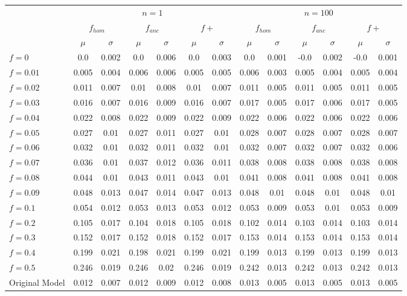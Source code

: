 \begin{tabular}{@{}lcccccccccccc@{}}
\toprule
 & \multicolumn{6}{c}{$n=1$} & \multicolumn{6}{c}{$n=100$} \\
\cmidrule(lr){2-7} \cmidrule(lr){8-13}
 & \multicolumn{2}{c}{$f_{hom}$} & \multicolumn{2}{c}{$f_{anc}$} & \multicolumn{2}{c}{$f+$} & \multicolumn{2}{c}{$f_{hom}$} & \multicolumn{2}{c}{$f_{anc}$} & \multicolumn{2}{c}{$f+$} \\
\cmidrule(lr){2-3} \cmidrule(lr){4-5} \cmidrule(lr){6-7} \cmidrule(lr){8-9} \cmidrule(lr){10-11} \cmidrule(lr){12-13}
 & $\mu$ & $\sigma$ & $\mu$ & $\sigma$ & $\mu$ & $\sigma$ & $\mu$ & $\sigma$ & $\mu$ & $\sigma$ & $\mu$ & $\sigma$ \\
\midrule
$f = 0$ & 0.0 & 0.002 & 0.0 & 0.006 & 0.0 & 0.003 & 0.0 & 0.001 & -0.0 & 0.002 & -0.0 & 0.001 \\
$f = 0.01$ & 0.005 & 0.004 & 0.006 & 0.006 & 0.005 & 0.005 & 0.006 & 0.003 & 0.005 & 0.004 & 0.005 & 0.004 \\
$f = 0.02$ & 0.011 & 0.007 & 0.01 & 0.008 & 0.01 & 0.007 & 0.011 & 0.005 & 0.011 & 0.005 & 0.011 & 0.005 \\
$f = 0.03$ & 0.016 & 0.007 & 0.016 & 0.009 & 0.016 & 0.007 & 0.017 & 0.005 & 0.017 & 0.006 & 0.017 & 0.005 \\
$f = 0.04$ & 0.022 & 0.008 & 0.022 & 0.009 & 0.022 & 0.009 & 0.022 & 0.006 & 0.022 & 0.006 & 0.022 & 0.006 \\
$f = 0.05$ & 0.027 & 0.01 & 0.027 & 0.011 & 0.027 & 0.01 & 0.028 & 0.007 & 0.028 & 0.007 & 0.028 & 0.007 \\
$f = 0.06$ & 0.032 & 0.01 & 0.032 & 0.011 & 0.032 & 0.01 & 0.032 & 0.007 & 0.032 & 0.007 & 0.032 & 0.006 \\
$f = 0.07$ & 0.036 & 0.01 & 0.037 & 0.012 & 0.036 & 0.011 & 0.038 & 0.008 & 0.038 & 0.008 & 0.038 & 0.008 \\
$f = 0.08$ & 0.044 & 0.01 & 0.043 & 0.011 & 0.043 & 0.01 & 0.041 & 0.008 & 0.041 & 0.008 & 0.041 & 0.008 \\
$f = 0.09$ & 0.048 & 0.013 & 0.047 & 0.014 & 0.047 & 0.013 & 0.048 & 0.01 & 0.048 & 0.01 & 0.048 & 0.01 \\
$f = 0.1$ & 0.054 & 0.012 & 0.053 & 0.013 & 0.053 & 0.012 & 0.053 & 0.009 & 0.053 & 0.01 & 0.053 & 0.009 \\
$f = 0.2$ & 0.105 & 0.017 & 0.104 & 0.018 & 0.105 & 0.018 & 0.102 & 0.014 & 0.103 & 0.014 & 0.103 & 0.014 \\
$f = 0.3$ & 0.152 & 0.017 & 0.152 & 0.018 & 0.152 & 0.017 & 0.153 & 0.014 & 0.153 & 0.014 & 0.153 & 0.014 \\
$f = 0.4$ & 0.199 & 0.021 & 0.198 & 0.021 & 0.199 & 0.021 & 0.199 & 0.013 & 0.199 & 0.013 & 0.199 & 0.013 \\
$f = 0.5$ & 0.246 & 0.019 & 0.246 & 0.02 & 0.246 & 0.019 & 0.242 & 0.013 & 0.242 & 0.013 & 0.242 & 0.013 \\
Original Model & 0.012 & 0.007 & 0.012 & 0.009 & 0.012 & 0.008 & 0.013 & 0.005 & 0.013 & 0.005 & 0.013 & 0.005 \\
\bottomrule
\end{tabular}

